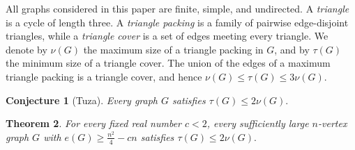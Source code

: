 \documentclass{article}
\newtheorem{theorem}{Theorem}[section]
\newtheorem{conjecture}[theorem]{Conjecture}
\begin{document}
All graphs considered in this paper are finite, simple, and undirected. A \emph{triangle} is a cycle of length three. A \emph{triangle packing} is a family of pairwise edge-disjoint triangles, while a \emph{triangle cover} is a set of edges meeting every triangle. We denote by $\nu(G)$ the maximum size of a triangle packing in $G$, and by $\tau(G)$ the minimum size of a triangle cover. The union of the edges of a maximum triangle packing is a triangle cover, and hence
$
\nu(G)\le \tau(G)\le 3\nu(G).
$
\begin{conjecture}[Tuza]\label{conj:tuza}
Every graph $G$ satisfies
$
\tau(G)\le 2\nu(G).
$
\end{conjecture}
\begin{theorem}\label{thm:main}
For every fixed real number $c<2$, every sufficiently large $n$-vertex graph $G$ with
$
e(G)\ge \frac{n^2}{4}-cn
$
satisfies
$
\tau(G)\le2\nu(G).
$
\end{theorem}
\end{document}
